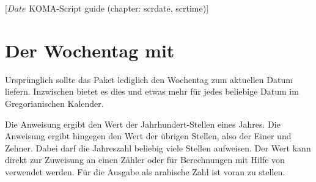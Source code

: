 %
%
%
%
%
%
%
%
% 
%
%
%
%

                 [$Date$
                  KOMA-Script guide (chapter: scrdate, scrtime)]

\chapter{Der Wochentag mit }
\BeginIndexGroup
{}

Ursprünglich sollte das Paket  lediglich den Wochentag zum
aktuellen Datum liefern. Inzwischen bietet es dies und etwas mehr für jedes
beliebige Datum im Gregorianischen Kalender.

\begin{Declaration}
\end{Declaration}%
Die Anweisung  ergibt
den Wert der Jahrhundert-Stellen eines Jahres. Die Anweisung
 ergibt hingegen den Wert der übrigen Stellen, also der
Einer und Zehner. Dabei darf die Jahreszahl beliebig viele Stellen aufweisen.
Der Wert kann direkt zur Zuweisung an einen Zähler oder für Berechnungen mit
Hilfe von  verwendet werden. Für die
Ausgabe  als arabische Zahl ist 
voran zu stellen.

